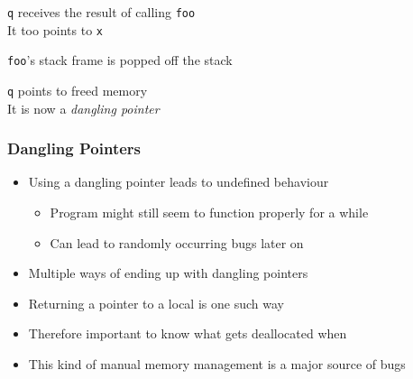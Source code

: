 \begin{frame}
\begin{overprint}
    \begin{center}
      \texttt{q} receives the result of calling \texttt{foo} \\
      It too points to \texttt{x}
    \end{center}

    \begin{center}
      \texttt{foo}'s stack frame is popped off the stack
    \end{center}

    \begin{center}
      \texttt{q} points to freed memory \\
      It is now a \emph{dangling pointer}
    \end{center}
  \end{overprint}
\end{frame}

\begin{frame}
  \frametitle{Dangling Pointers}
  \begin{itemize}
    \item Using a dangling pointer leads to undefined behaviour
          \begin{itemize}
            \item Program might still seem to function properly for a while
            \item Can lead to randomly occurring bugs later on
          \end{itemize}
    \item Multiple ways of ending up with dangling pointers
    \item Returning a pointer to a local is one such way
    \item Therefore important to know what gets deallocated when
    \item This kind of manual memory management is a major source of bugs
  \end{itemize}
\end{frame}


